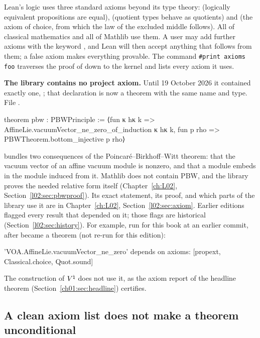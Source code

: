 Lean's logic uses three standard axioms beyond its type theory:  (logically equivalent
propositions are equal),  (quotient types behave as quotients) and
 (the axiom of choice, from which the law of the excluded middle follows).
All of classical mathematics and all of Mathlib use them. A user may add further axioms with the
keyword , and Lean will then accept anything that follows from them; a false axiom makes
everything provable. The command \texttt{\#print axioms foo} traverses the proof of  down
to the kernel and lists every axiom it uses.

\textbf{The library contains no project axiom.} Until 19 October 2026 it
contained exactly one, ; that declaration is now a theorem with the same name and type.
\noindent File .
\begin{leancode}
theorem pbw : PBWPrinciple :=
  ⟨fun κ hκ k => AffineLie.vacuumVector_ne_zero_of_induction κ hκ k,
    fun p rho => PBWTheorem.bottom_injective p rho⟩
\end{leancode}
 bundles two consequences of the Poincar\'e--Birkhoff--Witt theorem: that the
vacuum vector of an affine vacuum module is nonzero, and that a module embeds in the module induced
from it. Mathlib does not contain PBW, and the library proves the needed relative form itself
(Chapter~\ref{ch:L02}, Section~\ref{l02:sec:pbwproof}). Its exact statement, its proof, and which
parts of the library use it are in Chapter~\ref{ch:L02}, Section~\ref{l02:sec:axiom}. Earlier
editions flagged every result that depended on it; those flags are historical
(Section~\ref{l02:sec:history}). For example, run for this book at an earlier commit, after  became a theorem (not re-run for this edition):
\begin{plaincode}
'VOA.AffineLie.vacuumVector_ne_zero' depends on axioms: [propext, Classical.choice, Quot.sound]
\end{plaincode}
The construction of ${V^{\natural}}$ does not use it, as the axiom report of the headline theorem
(Section~\ref{ch01:sec:headline}) certifies.

\subsection{A clean axiom list does not make a theorem unconditional}\label{ch01:sec:uncond}

